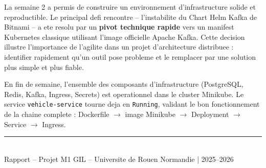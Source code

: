 \documentclass[12pt,a4paper]{article}
\begin{document}
La semaine 2 a permis de construire un environnement d'infrastructure solide et
reproductible. Le principal defi rencontre -- l'instabilite du Chart Helm Kafka de
Bitnami -- a ete resolu par un \textbf{pivot technique rapide} vers un manifest
Kubernetes classique utilisant l'image officielle Apache Kafka. Cette decision illustre
l'importance de l'agilite dans un projet d'architecture distribuee : identifier rapidement
qu'un outil pose probleme et le remplacer par une solution plus simple et plus fiable.

En fin de semaine, l'ensemble des composants d'infrastructure (PostgreSQL, Redis, Kafka,
Ingress, Secrets) est operationnel dans le cluster Minikube. Le service
\texttt{vehicle-service} tourne deja en \texttt{Running}, validant le bon fonctionnement
de la chaine complete : Dockerfile $\rightarrow$ image Minikube $\rightarrow$ Deployment
$\rightarrow$ Service $\rightarrow$ Ingress.

\vspace{1cm}
\begin{center}
\rule{0.5\linewidth}{0.4pt}\\[0.3cm]
{\small Rapport -- Projet M1 GIL -- Universite de Rouen Normandie | 2025--2026}
\end{center}
\end{document}
